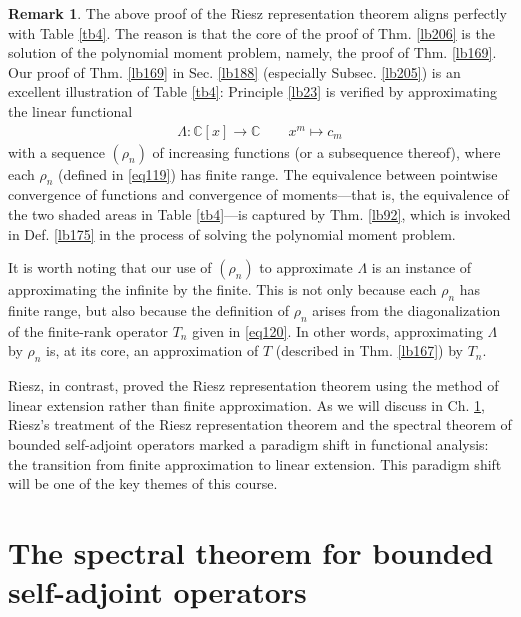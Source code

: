 \documentclass[12pt,b5paper,notitlepage]{article}
\theoremstyle{definition}
\newtheorem{rem}[df]{Remark}
\theoremstyle{plain}
\newcommand{\Cbb}{\mathbb C}
\newcommand{\hqed}{\hfill\qedsymbol}
\numberwithin{equation}{section}
\begin{document}
\begin{rem}
The above proof of the Riesz representation theorem aligns perfectly with Table \ref{tb4}. The reason is that the core of the proof of Thm. \ref{lb206} is the solution of the polynomial moment problem, namely, the proof of Thm. \ref{lb169}. Our proof of Thm. \ref{lb169} in Sec. \ref{lb188} (especially Subsec. \ref{lb205}) is an excellent illustration of Table \ref{tb4}: Principle \ref{lb23} is verified by approximating the linear functional
\begin{gather*}
\Lambda:\Cbb[x]\rightarrow\Cbb\qquad x^m\mapsto c_m
\end{gather*}
with a sequence $(\rho_n)$ of increasing functions (or a subsequence thereof), where each $\rho_n$ (defined in \eqref{eq119}) has finite range. The equivalence between pointwise convergence of functions and convergence of moments---that is, the equivalence of the two shaded areas in Table \ref{tb4}---is captured by Thm. \ref{lb92}, which is invoked in Def. \ref{lb175} in the process of solving the polynomial moment problem.

It is worth noting that our use of $(\rho_n)$ to approximate $\Lambda$ is an instance of approximating the infinite by the finite. This is not only because each $\rho_n$ has finite range, but also because the definition of $\rho_n$ arises from the diagonalization of the finite-rank operator $T_n$ given in \eqref{eq120}.  In other words, approximating $\Lambda$ by $\rho_n$ is, at its core, an approximation of $T$ (described in Thm. \ref{lb167}) by $T_n$.

Riesz, in contrast, proved the Riesz representation theorem using the method of linear extension rather than finite approximation. As we will discuss in Ch. \ref{lb181}, Riesz's treatment of the Riesz representation theorem and the spectral theorem of bounded self-adjoint operators marked a paradigm shift in functional analysis: the transition from finite approximation to linear extension. This paradigm shift will be one of the key themes of this course.    \hqed
\end{rem}











\newpage

\section{The spectral theorem for bounded self-adjoint operators}\label{lb181}
\end{document}
